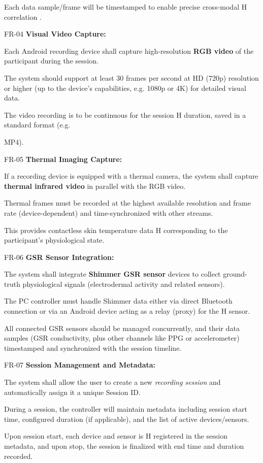 Each data sample/frame will be timestamped to enable precise cross-modal H
correlation .

FR-04 \textbf{Visual Video Capture:}

Each Android recording device shall capture high-resolution \textbf{RGB video}
 of the participant during the session.

The system should support at least 30 frames per second at HD (720p) resolution or
higher (up to the device's capabilities, e.g.  1080p or 4K) for detailed visual data.

The video recording is to be continuous for the session H duration, saved in a
standard format (e.g.

MP4).

FR-05 \textbf{Thermal Imaging Capture:}

If a recording device is equipped with a thermal camera, the system shall capture
\textbf{thermal infrared video}
 in parallel with the RGB video.

Thermal frames must be recorded at the highest available resolution and frame rate
(device-dependent) and time-synchronized with other streams.

This provides contactless skin temperature data H corresponding to the participant's
physiological state.

FR-06 \textbf{GSR Sensor Integration:}

The system shall integrate \textbf{Shimmer GSR sensor}
 devices to collect ground-truth physiological signals (electrodermal activity and
 related sensors).

The PC controller must handle Shimmer data either via direct Bluetooth connection or
via an Android device acting as a relay (proxy) for the H sensor.

All connected GSR sensors should be managed concurrently, and their data samples (GSR
conductivity, plus other channels like PPG or accelerometer) timestamped and
synchronized with the session timeline.

FR-07 \textbf{Session Management and Metadata:}

The system shall allow the user to create a new \textit{recording session} and
automatically assign it a unique Session ID.

During a session, the controller will maintain metadata including session start time,
configured duration (if applicable), and the list of active devices/sensors.

Upon session start, each device and sensor is H registered in the session metadata,
and upon stop, the session is finalized with end time and duration recorded.

